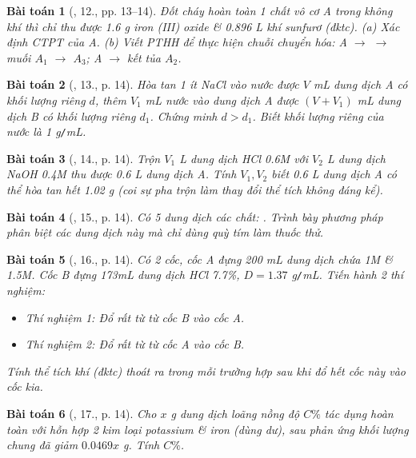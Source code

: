 \documentclass{article}
\newtheorem{baitoan}{Bài toán}
\begin{document}
\begin{baitoan}[\cite{An_400_BT_Hoa_Hoc_9}, 12., pp. 13--14]
	Đốt cháy hoàn toàn 1 chất vô cơ A trong không khí thì chỉ thu được {\rm1.6 g} iron ({\rm III}) oxide \& {\rm0.896 L} khí sunfurơ (đktc). (a) Xác định {\rm CTPT} của A. (b) Viết {\rm PTHH} để thực hiện chuỗi chuyển hóa: A $\to$ {\rm {}} $\to$ muối $A_1$ $\to$ $A_3$; A $\to$ kết tủa $A_2$.
\end{baitoan}

\begin{baitoan}[\cite{An_400_BT_Hoa_Hoc_9}, 13., p. 14]
	Hòa tan 1 ít {\rm NaCl} vào nước được $V$ {\rm mL} dung dịch A có khối lượng riêng $d$, thêm $V_1$ {\rm mL} nước vào dung dịch A được $(V + V_1)$ mL dung dịch B có khối lượng riêng $d_1$. Chứng minh $d > d_1$. Biết khối lượng riêng của nước là {\rm1 g{\tt/}mL}.
\end{baitoan}

\begin{baitoan}[\cite{An_400_BT_Hoa_Hoc_9}, 14., p. 14]
	Trộn $V_1$ {\rm L} dung dịch {\rm HCl 0.6M} với $V_2$ {\rm L} dung dịch {\rm NaOH 0.4M} thu được {\rm0.6 L} dung dịch A. Tính $V_1,V_2$ biết {\rm0.6 L} dung dịch A có thể hòa tan hết {\rm1.02 g } (coi sự pha trộn làm thay đổi thể tích không đáng kể).
\end{baitoan}

\begin{baitoan}[\cite{An_400_BT_Hoa_Hoc_9}, 15., p. 14]
	Có 5 dung dịch các chất: {\rm{}}. Trình bày phương pháp phân biệt các dung dịch này mà chỉ dùng quỳ tím làm thuốc thử.
\end{baitoan}

\begin{baitoan}[\cite{An_400_BT_Hoa_Hoc_9}, 16., p. 14]
	Có 2 cốc, cốc A đựng {\rm200 mL} dung dịch chứa {\rm{} 1M} \& {\rm{} 1.5M}. Cốc B đựng {\rm173mL} dung dịch {\rm HCl 7.7\%}, $D = 1.37$ {\rm g{\tt/}mL}. Tiến hành 2 thí nghiệm:
	\begin{itemize}
		\item Thí nghiệm 1: Đổ rất từ từ cốc B vào cốc A.
		\item Thí nghiệm 2: Đổ rất từ từ cốc A vào cốc B.
	\end{itemize}
	Tính thể tích khí (đktc) thoát ra trong mỗi trường hợp sau khi đổ hết cốc này vào cốc kia.
\end{baitoan}

\begin{baitoan}[\cite{An_400_BT_Hoa_Hoc_9}, 17., p. 14]
	Cho $x$ {\rm g} dung dịch {\rm{}} loãng nồng độ $C\%$ tác dụng hoàn toàn với hỗn hợp 2 kim loại potassium \& iron (dùng dư), sau phản ứng khối lượng chung đã giảm $0.0469x$ {\rm g}. Tính $C\%$.
\end{baitoan}
\end{document}

